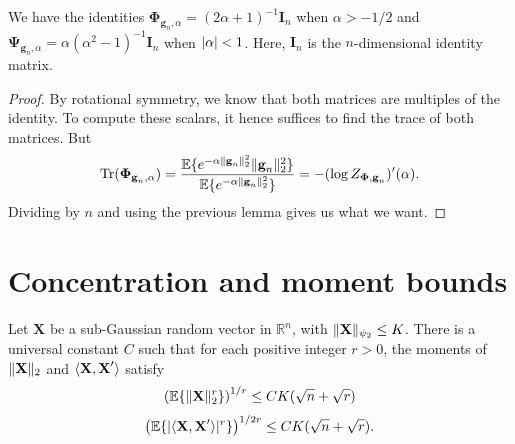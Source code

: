 \documentclass[final,12pt]{colt2018} %
\numberwithin{equation}{section}
\DeclarePairedDelimiter{\abs}{\lvert}{\rvert}
\DeclarePairedDelimiter{\norm}{\lVert}{\rVert}
\DeclarePairedDelimiter{\paren}{(}{)}
\DeclarePairedDelimiter{\braces}{\lbrace}{\rbrace}
\DeclarePairedDelimiter{\inprod}{\langle}{\rangle}
\newcommand{\E}{\mathbb{E}}
\newcommand{\R}{\mathbb{R}}
\newcommand{\boldg}{\textbf{g}}
\newcommand{\boldPhi}{\boldsymbol{\Phi}}
\newcommand{\boldPsi}{\boldsymbol{\Psi}}
\newcommand{\boldI}{\textbf{I}}
\newcommand{\boldX}{\textbf{X}}
\begin{document}
\begin{lemma} \label{lem: formula for Phi and Psi for Gaussian}
	We have the identities $\boldPhi_{\boldg_n,\alpha} = (2\alpha+1)^{-1}\boldI_n$ when $\alpha > -1/2$ and $\boldPsi_{\boldg_n,\alpha} = \alpha(\alpha^2-1)^{-1}\boldI_n$ when $\abs{\alpha} < 1$. Here, $\boldI_n$ is the $n$-dimensional identity matrix.
\end{lemma}
\begin{proof}
	By rotational symmetry, we know that both matrices are multiples of the identity. To compute these scalars, it hence suffices to find the trace of both matrices. But
	\[
	\textnormal{Tr}\paren{\boldPhi_{\boldg_n,\alpha}} = \frac{\E\braces{e^{-\alpha\norm{\boldg_n}_2^2}\norm{\boldg_n}_2^2}}{\E\braces{ e^{-\alpha\norm{\boldg_n}_2^2}}} = -(\log Z_{\boldPhi,\boldg_n})'(\alpha).
	\]
	Dividing by $n$ and using the previous lemma gives us what we want.
\end{proof}

\section{Concentration and moment bounds} \label{concentration of estimators}

\begin{theorem} \label{norm concentration}
	Let $\boldX$ be a sub-Gaussian random vector in $\R^n$, with $\norm{\boldX}_{\psi_2} \leq K$. There is a universal constant $C$ such that for each positive integer $r > 0$, the moments of $\norm{\boldX}_2$ and $\inprod{\boldX,\boldX'}$ satisfy
	\begin{align} \label{norm moment bound 1}
	\paren*{\E\braces{\norm{\boldX}_2^r}}^{1/r} \leq CK\paren{\sqrt{n} + \sqrt{r}}
	\end{align}
	\begin{align} \label{norm moment bound 2}
	\paren*{\E\braces{\abs{\inprod{\boldX,\boldX'}}^r}}^{1/{2r}} \leq  CK\paren{\sqrt{n} + \sqrt{r}}.
	\end{align}
\end{theorem}
\end{document}
